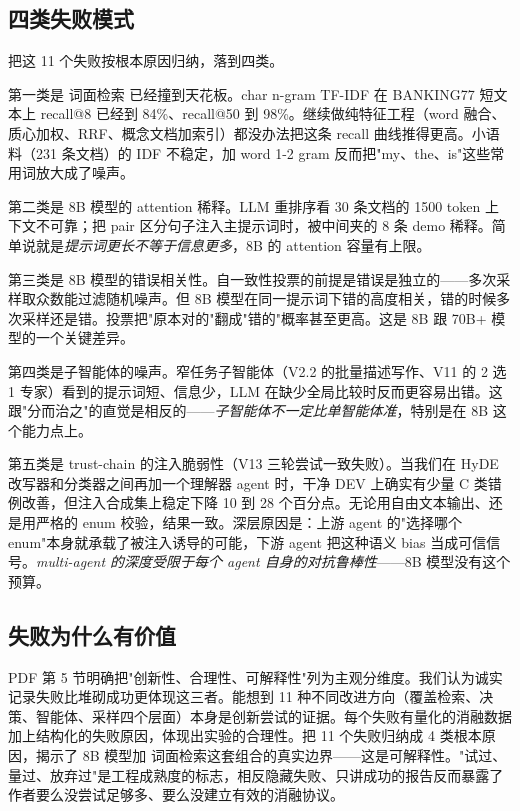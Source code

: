 \documentclass[11pt,a4paper]{article}
\begin{document}
\subsection{四类失败模式}

把这 11 个失败按根本原因归纳，落到四类。

第一类是 词面检索 已经撞到天花板。char n-gram TF-IDF 在 BANKING77 短文本上 recall@8 已经到 84\%、recall@50 到 98\%。继续做纯特征工程（word 融合、质心加权、RRF、概念文档加索引）都没办法把这条 recall 曲线推得更高。小语料（231 条文档）的 IDF 不稳定，加 word 1-2 gram 反而把"my、the、is"这些常用词放大成了噪声。

第二类是 8B 模型的 attention 稀释。LLM 重排序看 30 条文档的 1500 token 上下文不可靠；把 pair 区分句子注入主提示词时，被中间夹的 8 条 demo 稀释。简单说就是\emph{提示词更长不等于信息更多}，8B 的 attention 容量有上限。

第三类是 8B 模型的错误相关性。自一致性投票的前提是错误是独立的——多次采样取众数能过滤随机噪声。但 8B 模型在同一提示词下错的高度相关，错的时候多次采样还是错。投票把"原本对的"翻成"错的"概率甚至更高。这是 8B 跟 70B+ 模型的一个关键差异。

第四类是子智能体的噪声。窄任务子智能体（V2.2 的批量描述写作、V11 的 2 选 1 专家）看到的提示词短、信息少，LLM 在缺少全局比较时反而更容易出错。这跟"分而治之"的直觉是相反的——\emph{子智能体不一定比单智能体准}，特别是在 8B 这个能力点上。

第五类是 trust-chain 的注入脆弱性（V13 三轮尝试一致失败）。当我们在 HyDE 改写器和分类器之间再加一个理解器 agent 时，干净 DEV 上确实有少量 C 类错例改善，但注入合成集上稳定下降 10 到 28 个百分点。无论用自由文本输出、还是用严格的 enum 校验，结果一致。深层原因是：上游 agent 的"选择哪个 enum"本身就承载了被注入诱导的可能，下游 agent 把这种语义 bias 当成可信信号。\emph{multi-agent 的深度受限于每个 agent 自身的对抗鲁棒性}——8B 模型没有这个预算。

\subsection{失败为什么有价值}

PDF 第 5 节明确把"创新性、合理性、可解释性"列为主观分维度。我们认为诚实记录失败比堆砌成功更体现这三者。能想到 11 种不同改进方向（覆盖检索、决策、智能体、采样四个层面）本身是创新尝试的证据。每个失败有量化的消融数据加上结构化的失败原因，体现出实验的合理性。把 11 个失败归纳成 4 类根本原因，揭示了 8B 模型加 词面检索这套组合的真实边界——这是可解释性。"试过、量过、放弃过"是工程成熟度的标志，相反隐藏失败、只讲成功的报告反而暴露了作者要么没尝试足够多、要么没建立有效的消融协议。
\end{document}
